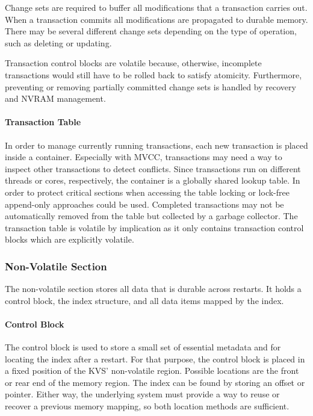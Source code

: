 Change sets are required to buffer all modifications that a transaction carries
out. When a transaction commits all modifications are propagated to durable
memory. There may be several different change sets depending on the type of
operation, such as deleting or updating.

Transaction control blocks are volatile because, otherwise, incomplete
transactions would still have to be rolled back to satisfy atomicity.
Furthermore, preventing or removing partially committed change sets is handled
by recovery and \ac{NVRAM} management.

\paragraph{Transaction Table}

In order to manage currently running transactions, each new transaction is
placed inside a container. Especially with \ac{MVCC}, transactions may need a
way to inspect other transactions to detect conflicts. Since transactions run on
different threads or cores, respectively, the container is a globally shared
lookup table. In order to protect critical sections when accessing the table
locking or lock-free append-only approaches could be used. Completed
transactions may not be automatically removed from the table but collected by a
garbage collector. The transaction table is volatile by implication as it only
contains transaction control blocks which are explicitly volatile.


\subsubsection{Non-Volatile Section}

The non-volatile section stores all data that is durable across restarts. It
holds a control block, the index structure, and all data items mapped by the
index.

\paragraph{Control Block}

The control block is used to store a small set of essential metadata and for
locating the index after a restart. For that purpose, the control block is
placed in a fixed position of the \ac{KVS}' non-volatile region. Possible
locations are the front or rear end of the memory region. The index can be found
by storing an offset or pointer. Either way, the underlying system must provide
a way to reuse or recover a previous memory mapping, so both location methods
are sufficient.

